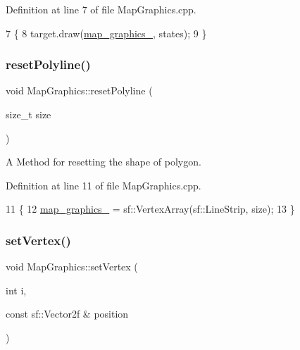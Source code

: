 Definition at line 7 of file Map\+Graphics.\+cpp.


\begin{DoxyCode}
7                                                                           \{
8     target.draw(\hyperlink{classMapGraphics_a2136d586176f0c3a008182ff3fba50e3}{map\_graphics\_}, states);
9 \}
\end{DoxyCode}
\mbox{\label{classMapGraphics_a389137596a79ed6a8239fe5451f8f470}} 
\subsubsection{\texorpdfstring{reset\+Polyline()}{resetPolyline()}}
{\footnotesize\ttfamily void Map\+Graphics\+::reset\+Polyline (\begin{DoxyParamCaption}\item[{size\+\_\+t}]{size }\end{DoxyParamCaption})}



A Method for resetting the shape of polygon. 



Definition at line 11 of file Map\+Graphics.\+cpp.


\begin{DoxyCode}
11                                            \{
12     \hyperlink{classMapGraphics_a2136d586176f0c3a008182ff3fba50e3}{map\_graphics\_} = sf::VertexArray(sf::LineStrip, size);
13 \}
\end{DoxyCode}
\mbox{\label{classMapGraphics_a0d58d85db2e9d6e62623ebab6ffa11e9}} 
\subsubsection{\texorpdfstring{set\+Vertex()}{setVertex()}}
{\footnotesize\ttfamily void Map\+Graphics\+::set\+Vertex (\begin{DoxyParamCaption}\item[{int}]{i,  }\item[{const sf\+::\+Vector2f \&}]{position }\end{DoxyParamCaption})}



